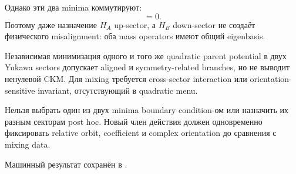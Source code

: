 Однако эти два minima коммутируют:
\begin{equation}
[H_A,H_B]=0.
\end{equation}
Поэтому даже назначение \(H_A\) up-sector, а \(H_B\) down-sector не создаёт
физического misalignment: оба mass operators имеют общий eigenbasis.

\begin{proposition}
Независимая минимизация одного и того же quadratic parent potential в двух
Yukawa sectors допускает aligned и symmetry-related branches, но не выводит
ненулевой CKM. Для mixing требуется cross-sector interaction или
orientation-sensitive invariant, отсутствующий в quadratic menu.
\end{proposition}

\begin{nogocriterion}
Нельзя выбрать один из двух minima boundary condition-ом или назначить их
разным секторам post hoc. Новый член действия должен одновременно фиксировать
relative orbit, coefficient и complex orientation до сравнения с mixing
data.
\end{nogocriterion}

Машинный результат сохранён в
.